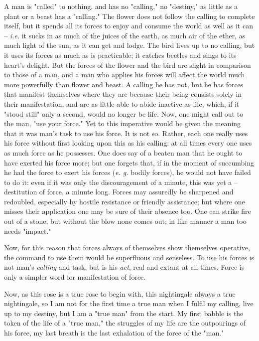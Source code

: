 A man is "{}called"{} to nothing, and has no "{}calling,"{} no "{}destiny,"{} 
as little as a plant or a beast has a "{}calling."{} The flower does not 
follow the calling to complete itself, but it spends all its forces to enjoy 
and consume the world as well as it can -- \textit{i.e.} it sucks in as much 
of the juices of the earth, as much air of the ether, as much light of the 
sun, as it can get and lodge. The bird lives up to no calling, but it uses its 
forces as much as is practicable; it catches beetles and sings to its heart's 
delight. But the forces of the flower and the bird are slight in comparison to 
those of a man, and a man who applies his forces will affect the world much 
more powerfully than flower and beast. A calling he has not, but he has forces 
that manifest themselves where they are because their being consists solely in 
their manifestation, and are as little able to abide inactive as life, which, 
if it "{}stood still"{} only a second, would no longer be life. Now, one might 
call out to the man, "{}use your force."{} Yet to this imperative would be 
given the meaning that it was man's task to use his force. It is not so. 
Rather, each one really uses his force without first looking upon this as his 
calling: at all times every one uses as much force as he possesses. One does 
say of a beaten man that he ought to have exerted his force more; but one 
forgets that, if in the moment of succumbing he had the force to exert his 
forces (\textit{e. g.} bodily forces), he would not have failed to do it: even 
if it was only the discouragement of a minute, this was yet a --destitution of 
force, a minute long. Forces may assuredly be sharpened and redoubled, 
especially by hostile resistance or friendly assistance; but where one misses 
their application one may be sure of their absence too. One can strike fire 
out of a stone, but without the blow none comes out; in like manner a man too 
needs "{}impact."{}

Now, for this reason that forces always of themselves show themselves 
operative, the command to use them would be superfluous and senseless. To use 
his forces is not man's \textit{calling} and task, but is his \textit{act}, 
real and extant at all times. Force is only a simpler word for manifestation 
of force.

Now, as this rose is a true rose to begin with, this nightingale always a true 
nightingale, so I am not for the first time a true man when I fulfil my 
calling, live up to my destiny, but I am a "{}true man"{} from the start. My 
first babble is the token of the life of a "{}true man,"{} the struggles of my 
life are the outpourings of his force, my last breath is the last exhalation 
of the force of the "{}man."{}

